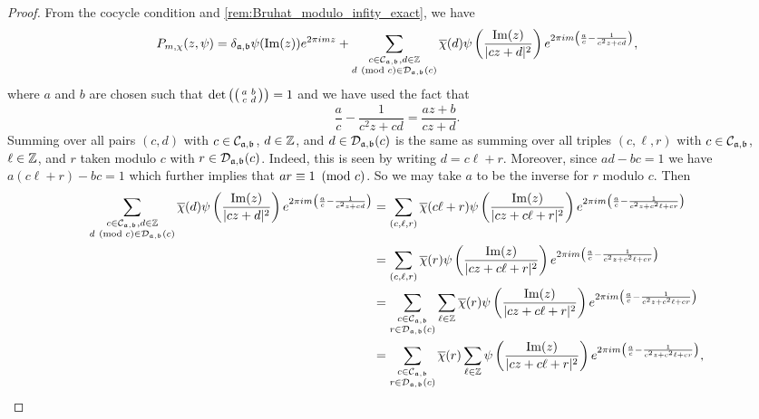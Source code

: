     \begin{proof}
      From the cocycle condition and \cref{rem:Bruhat_modulo_infity_exact}, we have
      \[
        P_{m,\chi}(z,\psi) = \delta_{\mathfrak{a},\mathfrak{{b}}}\psi(\mathrm{Im}(z))e^{2\pi imz}+\sum_{\substack{c \in \mathcal{C}_{\mathfrak{a},\mathfrak{b}}, d \in \mathbb{Z} \\ d \ \left(\text{mod }c\right) \in \mathcal{D}_{\mathfrak{a},\mathfrak{b}}(c)}}\overline{\chi}(d)\psi\left(\frac{\mathrm{Im}(z)}{|cz+d|^{2}}\right)e^{2\pi im\left(\frac{a}{c}-\frac{1}{c^{2}z+cd}\right)},
      \]
      where $a$ and $b$ are chosen such that $\det\left(\begin{psmallmatrix} a & b \\ c & d \end{psmallmatrix}\right) = 1$ and we have used the fact that
      \[
        \frac{a}{c}-\frac{1}{c^{2}z+cd} = \frac{az+b}{cz+d}.
      \]
      Summing over all pairs $(c,d)$ with $c \in \mathcal{C}_{\mathfrak{a},\mathfrak{b}}$, $d \in \mathbb{Z}$, and $d \in \mathcal{D}_{\mathfrak{a},\mathfrak{b}}(c)$ is the same as summing over all triples $(c,\ell,r)$ with $c \in \mathcal{C}_{\mathfrak{a},\mathfrak{b}}$, $\ell \in \mathbb{Z}$, and $r$ taken modulo $c$ with $r \in \mathcal{D}_{\mathfrak{a},\mathfrak{b}}(c)$. Indeed, this is seen by writing $d = c\ell+r$. Moreover, since $ad-bc = 1$ we have $a(c\ell+r)-bc = 1$ which further implies that $ar \equiv 1 \ \left(\text{mod }c\right)$. So we may take $a$ to be the inverse for $r$ modulo $c$. Then
      \begin{align*}
        \sum_{\substack{c \in \mc{C}_{\mf{a},\mf{b}}, d \in \Z \\ d \tmod{c} \in \mc{D}_{\mf{a},\mf{b}}(c)}}\cchi(d)\psi\left(\frac{\Im(z)}{|cz+d|^{2}}\right)e^{2\pi im\left(\frac{a}{c}-\frac{1}{c^{2}z+cd}\right)} &= \sum_{(c,\ell,r)}\cchi(c\ell+r)\psi\left(\frac{\Im(z)}{|cz+c\ell+r|^{2}}\right)e^{2\pi im\left(\frac{a}{c}-\frac{1}{c^{2}z+c^{2}\ell+cr}\right)} \\
        &= \sum_{(c,\ell,r)}\cchi(r)\psi\left(\frac{\Im(z)}{|cz+c\ell+r|^{2}}\right)e^{2\pi im\left(\frac{a}{c}-\frac{1}{c^{2}z+c^{2}\ell+cr}\right)} \\
        &= \sum_{\substack{c \in \mc{C}_{\mf{a},\mf{b}} \\ r \in \mc{D}_{\mf{a},\mf{b}}(c)}}\sum_{\ell \in \Z}\cchi(r)\psi\left(\frac{\Im(z)}{|cz+c\ell+r|^{2}}\right)e^{2\pi im\left(\frac{a}{c}-\frac{1}{c^{2}z+c^{2}\ell+cr}\right)} \\
        &= \sum_{\substack{c \in \mc{C}_{\mf{a},\mf{b}} \\ r \in \mc{D}_{\mf{a},\mf{b}}(c)}}\cchi(r)\sum_{\ell \in \Z}\psi\left(\frac{\Im(z)}{|cz+c\ell+r|^{2}}\right)e^{2\pi im\left(\frac{a}{c}-\frac{1}{c^{2}z+c^{2}\ell+cr}\right)},

\end{align*}
\end{proof}
